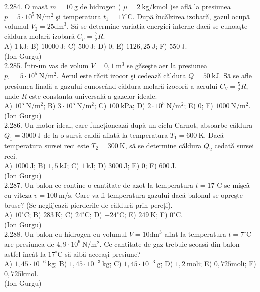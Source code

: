 2.284. O masă $m=10 \mathrm{~g}$ de hidrogen ( $\mu=2 \mathrm{~kg} / \mathrm{kmol}$ )se află la presiunea $p=5 \cdot 10^{5} \mathrm{~N} / \mathrm{m}^{2}$ şi temperatura $t_{1}=17^{\circ} \mathrm{C}$. Dupã încălzirea izobară, gazul ocupă volumul $V_{2}=25 \mathrm{dm}^{3}$. Să se determine variația energiei interne dacă se cunoaşte căldura molară izobară $C_{p}=\frac{7}{2} R$.\\ A) $1 \mathrm{~kJ}$; B) $10000 \mathrm{~J}$; C) $500 \mathrm{~J}$; D) 0; E) $1126,25 \mathrm{~J}$; F) $550 \mathrm{~J}$.\\ (Ion Gurgu)\\

2.285. Într-un vas de volum $V=0,1 \mathrm{~m}^{3}$ se găseşte aer la presiunea $p_{1}=5 \cdot 10^{5} \mathrm{~N} / \mathrm{m}^{2}$. Aerul este răcit izocor şi cedează căldura $Q=50 \mathrm{~kJ}$. Să se afle presiunea finală a gazului cunoscând căldura molară izocoră a aerului $C_{V}=\frac{5}{2} R$, unde $R$ este constanta universală a gazelor ideale.\\ A) $10^{5} \mathrm{~N} / \mathrm{m}^{2}$; B) $3 \cdot 10^{5} \mathrm{~N} / \mathrm{m}^{2}$; C) $100 \mathrm{~kPa}$; D) $2 \cdot 10^{5} \mathrm{~N} / \mathrm{m}^{2}$; E) 0; F) $1000 \mathrm{~N} / \mathrm{m}^{2}$.\\ (Ion Gurgu)\\

2.286. Un motor ideal, care funcționează după un ciclu Carnot, absoarbe căldura $Q_{1}=3000 \mathrm{~J}$ de la o sursă caldă aflată la temperatura $T_{1}=600 \mathrm{~K}$. Dacă temperatura sursei reci este $T_{2}=300 \mathrm{~K}$, să se determine căldura $Q_{2}$ cedată sursei reci.\\ A) $1000 \mathrm{~J}$; B) $1,5 \mathrm{~kJ}$; C) $1 \mathrm{~kJ}$; D) $3000 \mathrm{~J}$; E) 0; F) $600 \mathrm{~J}$.\\ (Ion Gurgu)\\

2.287. Un balon ce contine o cantitate de azot la temperatura $t=17^{\circ} \mathrm{C}$ se mişcã cu viteza $v=100 \mathrm{~m} / \mathrm{s}$. Care va fi temperatura gazului dacă balonul se opreşte brusc? (Se neglijează pierderile de căldură prin pereți).\\ A) $10^{\circ} \mathrm{C}$; B) $283 \mathrm{~K}$; C) $24^{\circ} \mathrm{C}$; D) $-24^{\circ} \mathrm{C}$; E) $249 \mathrm{~K}$; F) $0^{\circ} \mathrm{C}$.\\ (Ion Gurgu)\\

2.288. Un balon cu hidrogen cu volumul $V=10 \mathrm{dm}^{3}$ aflat la temperatura $t=7^{\circ} \mathrm{C}$ are presiunea de $4,9 \cdot 10^{6} \mathrm{~N} / \mathrm{m}^{2}$. Ce cantitate de gaz trebuie scoasă din balon astfel încât la $17^{\circ} \mathrm{C}$ să aibă aceeași presiune?\\ A) $1,45 \cdot 10^{-6} \mathrm{~kg}$; B) $1,45 \cdot 10^{-3} \mathrm{~kg}$; C) $1,45 \cdot 10^{-3} \mathrm{~g}$; D) $1,2 \mathrm{~moli}$; E) $0,725 \mathrm{moli}$; F) $0,725 \mathrm{kmol}$.\\ (Ion Gurgu)\\

